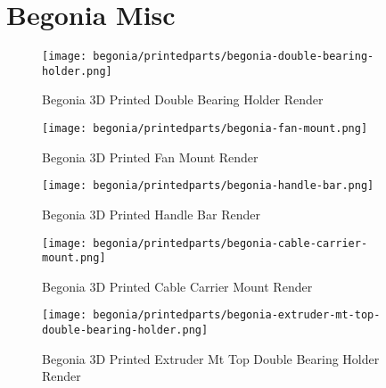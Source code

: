 \section{Begonia Misc}

\begin{figure}[H]
\centering
\texttt{[image: begonia/printedparts/begonia-double-bearing-holder.png]}
\caption{Begonia 3D Printed Double Bearing Holder Render}
\label{fig:begdoublebearingholder}
\end{figure}

\begin{figure}[H]
\centering
\texttt{[image: begonia/printedparts/begonia-fan-mount.png]}
\caption{Begonia 3D Printed Fan Mount Render}
\label{fig:begfanmount}
\end{figure}

\begin{figure}[H]
\centering
\texttt{[image: begonia/printedparts/begonia-handle-bar.png]}
\caption{Begonia 3D Printed Handle Bar Render}
\label{fig:beghandlebar}
\end{figure}

\begin{figure}[H]
\centering
\texttt{[image: begonia/printedparts/begonia-cable-carrier-mount.png]}
\caption{Begonia 3D Printed Cable Carrier Mount Render}
\label{fig:begcablecarriermount}
\end{figure}

\begin{figure}[H]
\centering
\texttt{[image: begonia/printedparts/begonia-extruder-mt-top-double-bearing-holder.png]}
\caption{Begonia 3D Printed Extruder Mt Top Double Bearing Holder Render}
\label{fig:begextrudermttop}
\end{figure}


